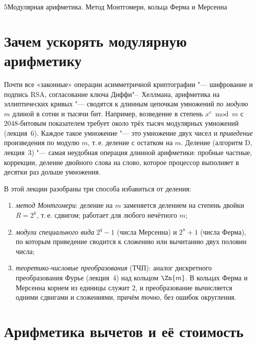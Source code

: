 \begin{lecture}{5}{Модулярная арифметика. Метод Монтгомери, кольца Ферма и Мерсенна}

\section{Зачем ускорять модулярную арифметику}

Почти все «законные» операции асимметричной криптографии "--- шифрование и подпись RSA,
согласование ключа Диффи"--~Хеллмана, арифметика на эллиптических кривых "--- сводятся
к длинным цепочкам умножений \emph{по модулю} $m$ длиной в сотни и тысячи бит. Например,
возведение в степень $x^e \bmod m$ с $2048$-битовым показателем требует около трёх тысяч
модулярных умножений (лекция~6). Каждое такое умножение "--- это умножение двух чисел и
\emph{приведение} произведения по модулю $m$, т.\,е. деление с остатком на $m$. Деление
(алгоритм D, лекция~3) "--- самая неудобная операция длинной арифметики: пробные частные,
коррекции, деление двойного слова на слово, которое процессор выполняет в десятки раз дольше
умножения.

В этой лекции разобраны три способа избавиться от деления:
\begin{enumerate}
  \item \emph{метод Монтгомери}: деление на $m$ заменяется делением на степень двойки
    $R = 2^k$, т.\,е. сдвигом; работает для любого нечётного $m$;
  \item \emph{модули специального вида} $2^q - 1$ (числа Мерсенна) и $2^n + 1$ (числа Ферма),
    по которым приведение сводится к сложению или вычитанию двух половин числа;
  \item \emph{теоретико-числовые преобразования} (ТЧП): аналог дискретного преобразования
    Фурье (лекция~4) над кольцом $\Zn{m}$. В кольцах Ферма и Мерсенна корнем из единицы служит
    $2$, и преобразование вычисляется одними сдвигами и сложениями, причём \emph{точно}, без
    ошибок округления.
\end{enumerate}

\section{Арифметика вычетов и её стоимость}


\end{lecture}
